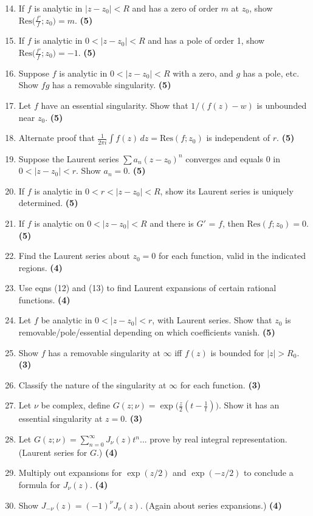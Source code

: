 \documentclass[12pt]{article}
\theoremstyle{definition} %
\theoremstyle{plain} %
\begin{document}
\begin{enumerate}
    \setcounter{enumi}{13}
    \item If $f$ is analytic in $|z-z_0|<R$ and has a zero of order $m$ at $z_0$, show $\mathrm{Res}\bigl(\frac{f'}{f};z_0\bigr)=m$. \quad \textbf{(5)}
    \item If $f$ is analytic in $0<|z-z_0|<R$ and has a pole of order 1, show $\mathrm{Res}\bigl(\frac{f'}{f};z_0\bigr)=-1$. \quad \textbf{(5)}
    \item Suppose $f$ is analytic in $0<|z-z_0|<R$ with a zero, and $g$ has a pole, etc. Show $fg$ has a removable singularity. \quad \textbf{(5)}
    \item Let $f$ have an essential singularity. Show that $1/(f(z)-w)$ is unbounded near $z_0$. \quad \textbf{(5)}
    \item Alternate proof that $\frac{1}{2\pi i}\int f(z)\,dz=\mathrm{Res}(f;z_0)$ is independent of $r$. \quad \textbf{(5)}
    \item Suppose the Laurent series $\sum a_n(z-z_0)^n$ converges and equals 0 in $0<|z-z_0|<r$. Show $a_n=0$. \quad \textbf{(5)}
    \item If $f$ is analytic in $0<r<|z-z_0|<R$, show its Laurent series is uniquely determined. \quad \textbf{(5)}
    \item If $f$ is analytic on $0<|z-z_0|<R$ and there is $G'$ = $f$, then $\mathrm{Res}(f;z_0)=0$. \quad \textbf{(5)}
    \item Find the Laurent series about $z_0=0$ for each function, valid in the indicated regions. \quad \textbf{(4)}
    \item Use eqns (12) and (13) to find Laurent expansions of certain rational functions. \quad \textbf{(4)}
    \item Let $f$ be analytic in $0<|z-z_0|<r$, with Laurent series. Show that $z_0$ is removable/pole/essential depending on which coefficients vanish. \quad \textbf{(5)}
    \item Show $f$ has a removable singularity at $\infty$ iff $f(z)$ is bounded for $|z|>R_0$. \quad \textbf{(3)} 
    \item Classify the nature of the singularity at $\infty$ for each function. \quad \textbf{(3)}
    \item Let $\nu$ be complex, define $G(z;\nu)=\exp\bigl(\tfrac{z}{2}(t-\tfrac{1}{t})\bigr)$. Show it has an essential singularity at $z=0$. \quad \textbf{(3)}
    \item Let $G(z;\nu)=\sum_{n=0}^\infty J_\nu(z)t^n$... prove by real integral representation. (Laurent series for $G$.) \quad \textbf{(4)}
    \item Multiply out expansions for $\exp(z/2)$ and $\exp(-z/2)$ to conclude a formula for $J_\nu(z)$. \quad \textbf{(4)}
    \item Show $J_{-\nu}(z)=(-1)^\nu J_\nu(z)$. (Again about series expansions.) \quad \textbf{(4)}
\end{enumerate}
\end{document}

